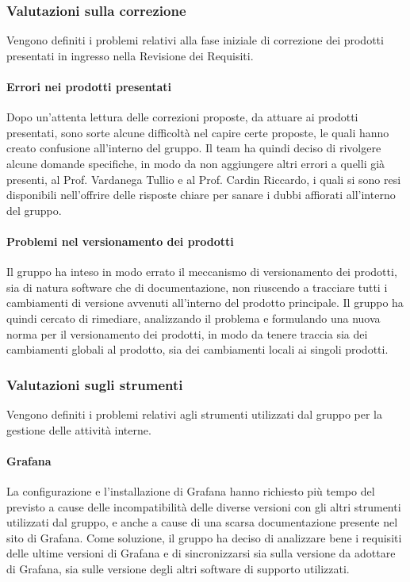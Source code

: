 \documentclass[../piano-di-qualifica.tex]{subfiles}
\begin{document}
\subsubsection{Valutazioni sulla correzione}
\label{sub:valutazioni_sulla_correzione}
Vengono definiti i problemi relativi alla fase iniziale di correzione dei prodotti presentati in ingresso nella Revisione dei Requisiti.

\paragraph{Errori nei prodotti presentati}
\label{sub:errori_nei_prodotti_presentati}
Dopo un'attenta lettura delle correzioni proposte, da attuare ai prodotti presentati, sono sorte alcune difficoltà nel capire certe proposte, le quali hanno creato confusione all'interno del gruppo.
Il team ha quindi deciso di rivolgere alcune domande specifiche, in modo da non aggiungere altri errori a quelli già presenti, al Prof. Vardanega Tullio e al Prof. Cardin Riccardo, i quali si sono resi disponibili nell'offrire delle risposte chiare per sanare i dubbi affiorati all'interno del gruppo.

\paragraph{Problemi nel versionamento dei prodotti}
\label{sub:problemi_versionamento_prodotti}
Il gruppo ha inteso in modo errato il meccanismo di versionamento dei prodotti, sia di natura software che di documentazione, non riuscendo a tracciare tutti i cambiamenti di versione avvenuti all'interno del prodotto principale.
Il gruppo ha quindi cercato di rimediare, analizzando il problema e formulando una nuova norma per il versionamento dei prodotti, in modo da tenere traccia sia dei cambiamenti globali al prodotto, sia dei cambiamenti locali ai singoli prodotti.

\subsubsection{Valutazioni sugli strumenti}
\label{sub:valutazioni_strumenti}
Vengono definiti i problemi relativi agli strumenti utilizzati dal gruppo per la gestione delle attività interne.

\paragraph{Grafana}
\label{sub:grafana}
La configurazione e l'installazione di Grafana hanno richiesto più tempo del previsto a cause delle incompatibilità delle diverse versioni con gli altri strumenti utilizzati dal gruppo, e anche a cause di una scarsa documentazione presente nel sito di Grafana.
Come soluzione, il gruppo ha deciso di analizzare bene i requisiti delle ultime versioni di Grafana e di sincronizzarsi sia sulla versione da adottare di Grafana, sia sulle versione degli altri software di supporto utilizzati.
\end{document}
